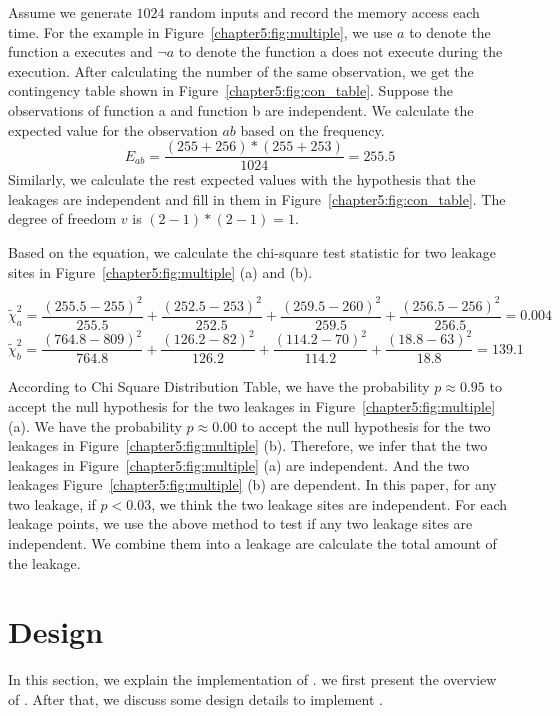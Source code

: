 Assume we generate $1024$ random inputs and record the memory access each time. For the example in Figure~\ref{chapter5:fig:multiple}, we use $a$ to denote the function \textsf{a} executes and $\lnot a$ to denote the function \textsf{a} does not execute during the execution. After calculating the number of the same observation, we get the contingency table shown in Figure~\ref{chapter5:fig:con_table}. Suppose the observations of function \textsf{a} and function \textsf{b} are independent. We calculate the expected value for the observation $ab$ based on the frequency.
\[ E_{ab} = \frac{(255+256)*(255+253)}{1024} = 255.5\]
Similarly, we calculate the rest expected values with the hypothesis that the leakages are independent and fill in them in Figure~\ref{chapter5:fig:con_table}. The degree of freedom $v$ is $(2-1)*(2-1) = 1$.

Based on the equation, we calculate the chi-square test statistic for two leakage sites in Figure~\ref{chapter5:fig:multiple} (a) and (b).

\[\tilde{\chi}^2_{a}= \frac{(255.5-255)^2}{255.5} + \frac{(252.5-253)^2}{252.5} + \frac{(259.5-260)^2}{259.5} + \frac{(256.5-256)^2}{256.5} = 0.004\] 
\[\tilde{\chi}^2_{b}= \frac{(764.8-809)^2}{764.8} + \frac{(126.2-82)^2}{126.2} + \frac{(114.2-70)^2}{114.2} + \frac{(18.8-63)^2}{18.8} = 139.1\] 

According to Chi Square Distribution Table, we have the probability $p\approx0.95$ to accept the null hypothesis for the two leakages in Figure~\ref{chapter5:fig:multiple} (a). We have the probability $p\approx0.00$ to accept the null hypothesis for the two leakages in Figure~\ref{chapter5:fig:multiple} (b). Therefore, we infer that the two leakages in Figure~\ref{chapter5:fig:multiple} (a) are independent. And the two leakages Figure~\ref{chapter5:fig:multiple} (b) are dependent. In this paper, for any two leakage, if $p < 0.03$, we think the two leakage sites are independent. For each leakage points, we use the above method to test if any two leakage sites are independent. We combine them into a leakage are calculate the total amount of the leakage.
\section{Design}
In this section, we explain the implementation of \ctool{}.
we first present the overview of \ctool{}. After that, we discuss some design details to implement \ctool{}.

